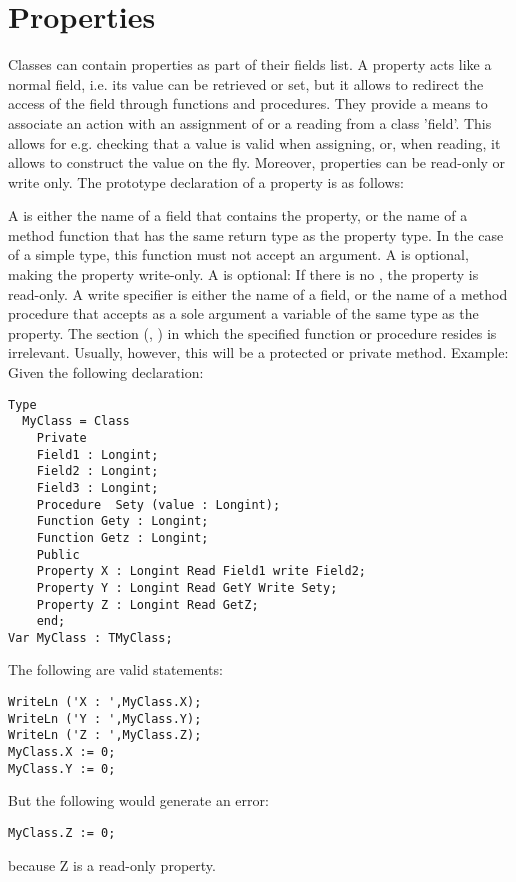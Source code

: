 \section{Properties}
Classes can contain properties as part of their fields list. A property
acts like a normal field, i.e. its value can be retrieved or set, but it
allows to redirect the access of the field through functions and
procedures. They provide a means to associate an action with an assignment
of or a reading from a class 'field'. This allows for e.g. checking that a
value is valid when assigning, or, when reading, it allows to construct the
value on the fly. Moreover, properties can be read-only or write only.
The prototype declaration of a property is as follows:

A  is either the name of a field that contains the
property, or the name of a method function that has the same return type as
the property type. In the case of a simple type, this
function must not accept an argument. A  is optional,
making the property write-only.
A  is optional: If there is no , the
property is read-only. A write specifier is either the name of a field, or
the name of a method procedure that accepts as a sole argument a variable of
the same type as the property.
The section (, ) in which the specified function or
procedure resides is irrelevant. Usually, however, this will be a protected
or private method.
Example:
Given the following declaration:
\begin{verbatim}
Type
  MyClass = Class
    Private
    Field1 : Longint;
    Field2 : Longint;
    Field3 : Longint;
    Procedure  Sety (value : Longint);
    Function Gety : Longint;
    Function Getz : Longint;
    Public
    Property X : Longint Read Field1 write Field2;
    Property Y : Longint Read GetY Write Sety;
    Property Z : Longint Read GetZ;
    end;
Var MyClass : TMyClass;
\end{verbatim}
The following are valid statements:
\begin{verbatim}
WriteLn ('X : ',MyClass.X);
WriteLn ('Y : ',MyClass.Y);
WriteLn ('Z : ',MyClass.Z);
MyClass.X := 0;
MyClass.Y := 0;
\end{verbatim}
But the following would generate an error:
\begin{verbatim}
MyClass.Z := 0;
\end{verbatim}
because Z is a read-only property.
